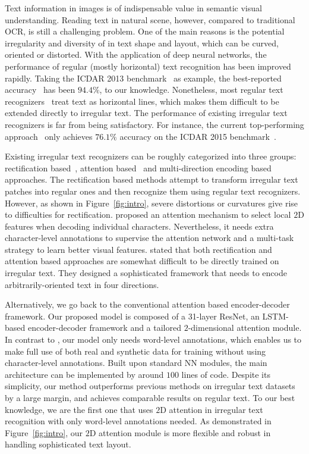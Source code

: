 \documentclass[letterpaper]{article} \usepackage{aaai19}  \usepackage{times}  \usepackage{helvet}  \usepackage{courier}  \usepackage{url}  \usepackage{graphicx}  \usepackage{amsmath}
\begin{document}
Text information in images is of indispensable value in semantic visual understanding.
Reading text in natural scene, however, compared to traditional OCR, is still a challenging problem.
One of the main reasons is the potential irregularity and diversity of in text shape and layout, which can be curved, oriented or distorted.
With the application of deep neural networks, the performance of regular (mostly horizontal) text recognition has been improved rapidly. Taking the ICDAR 2013 benchmark~\cite{icdar2013} as example, the best-reported accuracy~\cite{cheng_EditDistance} has been $94.4\%$, to our knowledge.
Nonetheless, most regular text recognizers~\cite{ShiBY15,OCRNIPS17} treat text as horizontal lines, which makes them difficult to be extended directly to irregular text.
The performance of existing irregular text recognizers is far from being satisfactory.
For instance, the current top-performing approach~\cite{shiPAMI2018} only achieves $76.1\%$ accuracy on the ICDAR 2015 benchmark~\cite{icdar2015}.


Existing irregular text recognizers can be roughly categorized into three groups:
rectification based~\cite{shiCVPR2016,shiPAMI2018,BMVC2016_43,Liu2018CharNetAC}, attention based~\cite{ijcai2017,Cheng2017} and multi-direction encoding based~\cite{Cheng2018AON} approaches.
The rectification based methods attempt to transform irregular text patches into regular ones and then recognize them using regular text recognizers.
However, as shown in Figure~\ref{fig:intro}, severe distortions or curvatures give rise to difficulties for rectification.
\cite{ijcai2017} proposed an attention mechanism to select local $2$D features when decoding individual characters.
Nevertheless, it needs extra character-level annotations to supervise the attention network and a multi-task strategy to learn better visual features.
\cite{Cheng2018AON} stated that both rectification and attention based approaches are somewhat difficult to be directly trained on irregular text.
They designed a sophisticated framework that needs to encode arbitrarily-oriented text in four directions.

Alternatively, we go back to the conventional attention based encoder-decoder framework.
Our proposed model is composed of a 31-layer ResNet, an LSTM-based encoder-decoder framework and a tailored $2$-dimensional attention module.
In contrast to \cite{ijcai2017}, our model only needs word-level annotations, which enables us to make full use of both real and synthetic data for training without using character-level annotations.
Built upon standard NN modules, the main architecture can be implemented by around $100$ lines of code.
Despite its simplicity, our method outperforms previous methods on irregular text datasets by a large margin,
and achieves comparable results on regular text. To our best knowledge, we are the first one that uses $2$D attention in irregular text recognition with only word-level annotations needed.
As demonstrated in Figure~\ref{fig:intro}, our $2$D attention module is more flexible and robust in handling sophisticated text layout.
\end{document}
